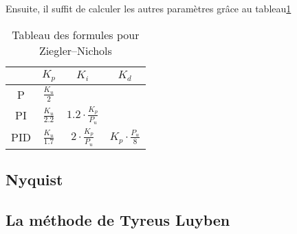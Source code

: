 Ensuite, il suffit de calculer les autres paramètres grâce au tableau\ref{tab:ZieglerNicholsTuningFormulas}

\begin{table}[ht]
	\begin{center}	
		\begin{tabular}{|c | c | c | c|}
			\hline
			& $K_p$ & $K_i$ & $K_d$\\ \hline
			P & \(\frac{K_u}{2}\) & &\\ \hline
			PI & \(\frac{K_u}{2.2}\) & \(1.2 \cdot \frac{K_p}{P_u}\) &\\ \hline
			PID & \(\frac{K_u}{1.7}\) & \(2 \cdot \frac{K_p}{P_u}\) & \(K_p \cdot \frac{P_u}{8}\)\\
			\hline
		\end{tabular}
	\end{center}
	\caption{Tableau des formules pour Ziegler–Nichols}
	\label{tab:ZieglerNicholsTuningFormulas}
\end{table}

\subsection{Nyquist} 

\subsection{La méthode de Tyreus Luyben}
